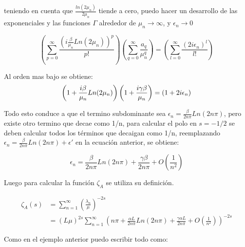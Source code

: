 teniendo en cuenta que $\frac{ln(2 \mu _n)}{2 \mu _n }$ tiende a cero, puedo hacer un desarrollo de las exponenciales y las funciones $\Gamma$ alrededor de $ \mu _n \rightarrow \infty $, y $\epsilon _n \rightarrow 0$

\begin{equation}
    \left(
    \sum _{p = 0} ^{\infty} \frac{ \left( i \frac{\beta}{ \mu _n } Ln(2 \mu _n ) \right) ^p }{p!}
    \right)
    \left(
	\sum _{q = 0} ^{\infty} \frac{a _q}{\mu _n ^q}
	\right)
    =
    \left(
    \sum _{l = 0} ^{\infty} \frac{( 2 i \epsilon _n)^l}{l !}
    \right)
\end{equation}


Al orden mas bajo se obtiene: \\

\begin{equation}
\left( 1 + \frac{i \beta}{ \mu _n} Ln( 2 \mu _n) \right) 
\left(1 + \frac{i  \gamma \beta}{ \mu _n} \right)  =
(1 + 2 i \epsilon _n) \\[5pt]
\end{equation}

Todo esto conduce a que el termino subdominante sea $\epsilon _n =  \frac{\beta }{2 n \pi}  Ln(2 n \pi)$, pero existe otro termino que decae como 1/n, para calcular el polo en $s=-1/2$ se deben calcular todos los términos que decaigan como 1/n, reemplazando $\epsilon _n =  \frac{\beta }{2 n \pi} Ln(2 n \pi) + \epsilon '$ en la ecuación anterior, se obtiene:


\begin{equation}
    \epsilon _n =  \frac{\beta }{2 n \pi} Ln(2 n \pi) +
                \frac{\gamma \beta}{2 n \pi} +
                O\left(  \frac{1}{n^2} \right)
\end{equation}

Luego para calcular la función $\zeta _{A}$ se utiliza su definición.

\begin{equation}
\begin{aligned}
    \zeta _A (s) &= \sum _{n=1} ^{\infty} \left( \frac{\lambda _n}{\mu} \right) ^{-2 s}  \\
    & =    ( L \mu ) ^{2 s} \sum _{n=1} ^{\infty} 
    \left( 
    n \pi + \frac{\alpha L }{2 n \pi} Ln(2 n \pi) + \frac{\gamma \alpha L}{2 n \pi} +
    O(\frac{1}{n^2})
    \right) ^{-2s}
\end{aligned}
\end{equation}

Como en el ejemplo anterior puedo escribir todo como:

